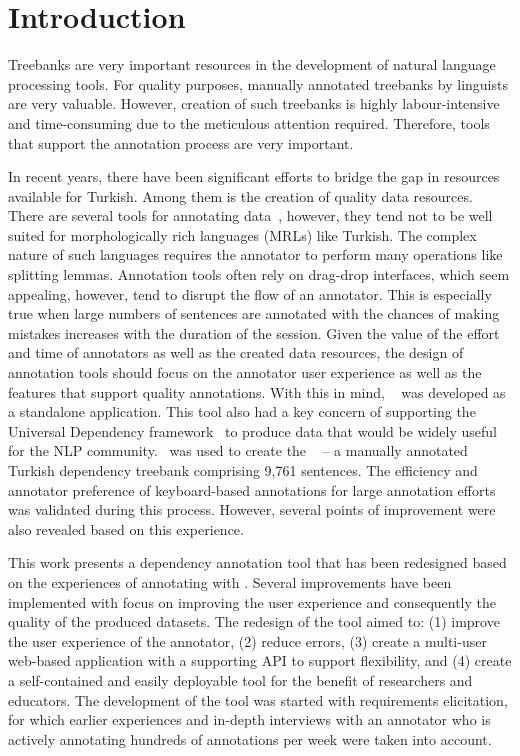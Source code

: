 \section{Introduction}
\label{sec:introduction}

Treebanks are very important resources in the development of natural language processing tools.
For quality purposes, manually annotated treebanks by linguists are very valuable. 
However, creation of such treebanks is highly labour-intensive and time-consuming due to the meticulous attention required.
Therefore, tools that support the annotation process are very important. 

In recent years, there have been significant efforts to bridge the gap in resources available for Turkish. 
Among them is the creation of quality data resources. 
There are several tools for annotating data~\cite{brat,dgannotator}, however, they tend not to be well suited for morphologically rich languages (MRLs) like Turkish.
The complex nature of such languages requires the annotator to perform many operations like splitting lemmas.
Annotation tools often rely on drag-drop interfaces, which seem appealing, however, tend to disrupt the flow of an annotator. 
This is especially true when  large numbers of sentences are annotated  with the chances of making mistakes increases with the duration of the session. 
Given the value of the effort and time of annotators as well as the created data resources, the design of annotation tools should focus on the annotator user experience as well as the features that support quality annotations. 
With this in mind, \boatvone~\cite{trk2020resources} was developed as a standalone application.
This tool also had a key concern of supporting the Universal Dependency framework~\cite{UD} to produce data that would be widely useful for the NLP community.
\boatvone\ was used to create the \bountreebank~\cite{turk-etal-2019-turkish,trk2020resources,UD-Boun-Treebank} -- a manually annotated Turkish dependency treebank comprising 9,761 sentences.
The efficiency and annotator preference of keyboard-based annotations for large annotation efforts was validated during this process. 
However, several points of improvement were also revealed based on this experience.  

This work presents a dependency annotation tool that has been redesigned based on the experiences of annotating with \boatvone.
Several improvements have been implemented with focus on improving the user experience and consequently the quality of the produced datasets.
The redesign of the tool aimed to: (1) improve the user experience of the annotator, (2) reduce errors, (3) create a multi-user web-based application with a supporting API to support flexibility, and (4) create a self-contained and easily deployable tool for the benefit of researchers and educators. 
The development of the tool was started with requirements elicitation, for which earlier experiences and in-depth interviews with an annotator who is actively annotating hundreds of annotations per week were taken into account.

